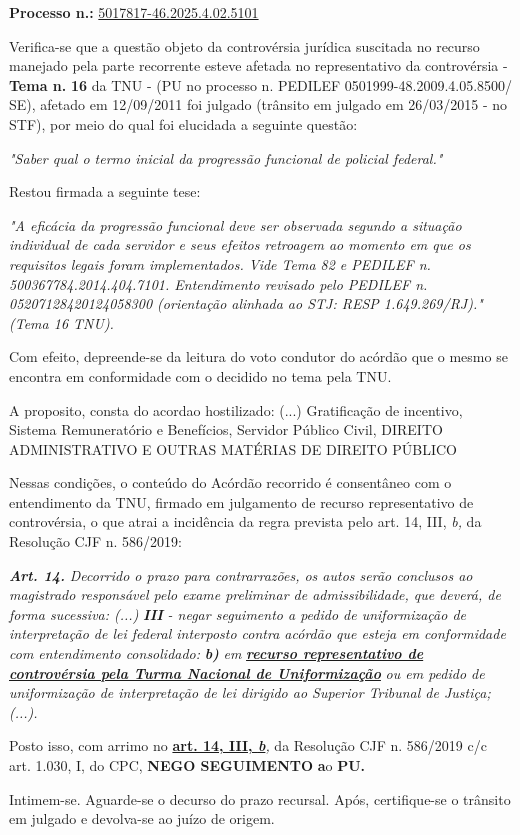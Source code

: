 \documentclass[12pt]{article}
\begin{document}
\justifying
\noindent \textbf{Processo n.: }\uline{5017817-46.2025.4.02.5101}

\noindent Verifica-se que a questão objeto da controvérsia jurídica suscitada no recurso manejado pela parte recorrente esteve afetada no representativo da controvérsia - \textbf{Tema n. }\textbf{16} da TNU - (PU no processo n. PEDILEF 0501999-48.2009.4.05.8500/ SE),  afetado em 12/09/2011 foi julgado (trânsito em julgado em 26/03/2015 - no STF), por meio do qual foi elucidada a seguinte questão:

{\leftskip=3.1cm\rightskip=0.8cm\parindent=0pt \textit{"Saber qual o termo inicial da progressão funcional de policial federal."}\par}

\noindent Restou firmada a seguinte tese:

{\leftskip=3.1cm\rightskip=0.8cm\parindent=0pt \textit{"A eficácia da progressão funcional deve ser observada segundo a situação individual de cada servidor e seus efeitos retroagem ao momento em que os requisitos legais foram implementados. Vide Tema 82 e PEDILEF n. 500367784.2014.404.7101. Entendimento revisado pelo PEDILEF n. 05207128420124058300 (orientação alinhada ao STJ: RESP 1.649.269/RJ)." (Tema 16 TNU).}\par}

\noindent Com efeito, depreende-se da leitura do voto condutor do acórdão que o mesmo se encontra em conformidade com o decidido no  tema pela TNU.

\noindent A proposito, consta do acordao hostilizado: (...) Gratificação de incentivo, Sistema Remuneratório e Benefícios, Servidor Público Civil, DIREITO ADMINISTRATIVO E OUTRAS MATÉRIAS DE DIREITO PÚBLICO

\noindent Nessas condições, o conteúdo do Acórdão recorrido é consentâneo com o entendimento da TNU, firmado em julgamento de recurso representativo de controvérsia, o que atrai a incidência da regra prevista pelo art. 14, III, \textit{b,} da Resolução CJF n. 586/2019:

\noindent \textit{\textbf{Art. 14.}}\textit{ Decorrido o prazo para contrarrazões, os autos serão conclusos ao magistrado responsável pelo exame preliminar de admissibilidade, que deverá, de forma sucessiva: (...) }\textit{\textbf{III }}\textit{- negar seguimento a pedido de uniformização de interpretação de lei federal interposto contra acórdão que esteja em conformidade com entendimento consolidado: }\textit{\textbf{b)}}\textit{ em }\textit{\textbf{\uline{recurso representativo de controvérsia pela Turma Nacional de Uniformização}}}\textit{ ou em pedido de uniformização de interpretação de lei dirigido ao Superior Tribunal de Justiça;(...).}

\noindent Posto isso, com arrimo no \textbf{\uline{art. 14, III, }}\textit{\textbf{\uline{b}}}\textit{,} da Resolução CJF n. 586/2019 c/c art. 1.030, I, do CPC, \textbf{NEGO SEGUIMENTO }\textbf{a}o\textbf{ PU}\textbf{.}

\noindent Intimem-se. Aguarde-se o decurso do prazo recursal. Após, certifique-se o trânsito em julgado e devolva-se ao juízo de origem.
\end{document}
